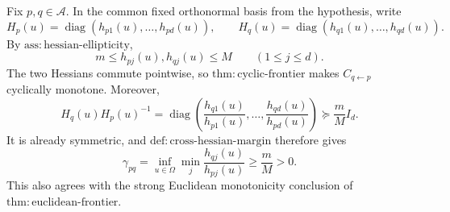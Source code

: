Fix \(p,q\in\mathcal A\).  In the common fixed orthonormal basis from the hypothesis, write
\[
 H_p(u)=\operatorname{diag}(h_{p1}(u),\ldots,h_{pd}(u)),
 \qquad
 H_q(u)=\operatorname{diag}(h_{q1}(u),\ldots,h_{qd}(u)).
\]
By \(\mathrm{ass:hessian\text{-}ellipticity}\),
\[
 m\le h_{pj}(u),h_{qj}(u)\le M
 \qquad(1\le j\le d).
\]
The two Hessians commute pointwise, so \(\mathrm{thm:cyclic\text{-}frontier}\) makes \(C_{q\leftarrow p}\) cyclically monotone.  Moreover,
\[
 H_q(u)H_p(u)^{-1}
 =\operatorname{diag}\!\left(\frac{h_{q1}(u)}{h_{p1}(u)},\ldots,
 \frac{h_{qd}(u)}{h_{pd}(u)}\right)
 \succeq\frac mM I_d.
\]
It is already symmetric, and \(\mathrm{def:cross\text{-}hessian\text{-}margin}\) therefore gives
\[
 \gamma_{pq}
 =\inf_{u\in\Omega}\min_j\frac{h_{qj}(u)}{h_{pj}(u)}
 \ge\frac mM>0.
\]
This also agrees with the strong Euclidean monotonicity conclusion of \(\mathrm{thm:euclidean\text{-}frontier}\).
